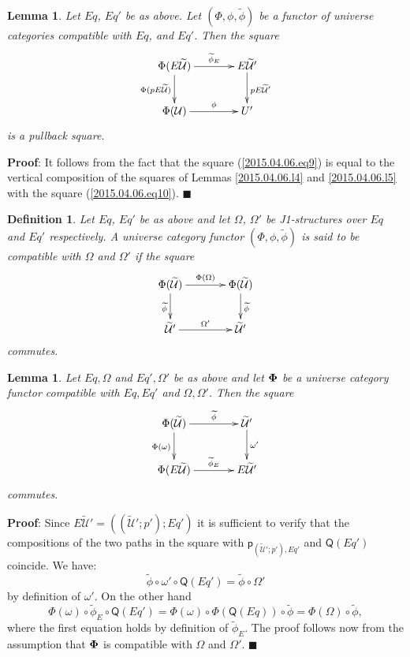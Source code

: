 \documentclass[12pt]{article}
\numberwithin{equation}{section}
\newenvironment{eq}{\begin{equation}}{\end{equation}}
\newenvironment{myproof}{{\bf Proof}:}{$\blacksquare$ \vskip 5mm }
\newtheorem{lemma}[proposition]{Lemma}
\newtheorem{definition}[proposition]{Definition}
\newcommand{\wt}{\widetilde}
\newcommand{\p}{\mathsf{p}}
\newcommand{\U}{\mathcal{U}}
\newcommand{\Q}{\mathsf{Q}}
\begin{document}
%
\begin{lemma}
\label{2015.04.06.l6} Let $Eq$, $Eq'$ be as above. Let $(\Phi,\phi,\wt{\phi})$
be a functor of universe categories compatible with $Eq$, and $Eq'$. Then the
square
%
\begin{eq}\label{2015.04.06.eq9}
\begin{xy}
          \xymatrix@C=3pc{ \Phi(E\wt{\U}) \ar[r]^-{\wt{\phi}_{E}}
            \ar[d]_{\Phi(pE\wt{\U})} & E\wt{\U}' \ar[d]^{pE\wt{\U}'}\\ \Phi(\U)
            \ar[r]^-{\phi} & U' }
\end{xy}
\end{eq}%
%
is a pullback square.
%
\end{lemma} 
%
\begin{myproof}
It follows from the fact that the square (\ref{2015.04.06.eq9}) is equal to the
vertical composition of the squares of Lemmas \ref{2015.04.06.l4} and
\ref{2015.04.06.l5} with the square (\ref{2015.04.06.eq10}).
\end{myproof}
%


\begin{definition}
\label{2015.04.06.def5} Let $Eq$, $Eq'$ be as above and let $\Omega$,
$\Omega'$ be J1-structures over $Eq$ and $Eq'$ respectively. A universe
category functor $(\Phi,\phi,\wt{\phi})$ is said to be compatible with $\Omega$
and $\Omega'$ if the square
%
$$
\begin{xy}
          \xymatrix@C=3pc{ \Phi(\wt{\U}) \ar[r]^-{\Phi(\Omega)}
            \ar[d]_{\wt{\phi}} & \Phi(\wt{\U})\ar[d]^{\wt{\phi}}\\ \wt{\U}'
            \ar[r]^-{\Omega'} & \wt{\U}' }
\end{xy}
$$
%
commutes.
\end{definition}
%
\begin{lemma}
\label{2015.04.10.l7} Let $Eq,\Omega$ and $Eq',\Omega'$ be as above and let
${\bf\Phi}$ be a universe category functor compatible with $Eq,Eq'$ and
$\Omega,\Omega'$. Then the square
%
$$
\begin{xy}
          \xymatrix@C=3pc{ \Phi(\wt{\U}) \ar[r]^-{\wt{\phi}}
            \ar[d]_{\Phi(\omega)} & \wt{\U}'\ar[d]^-{\omega'}\\ \Phi(E\wt{\U})
            \ar[r]^-{\wt{\phi}_{E}} & E\wt{\U}' }
\end{xy}
$$
%
commutes.
\end{lemma}
%
\begin{myproof}
Since $E\wt{\U}'=((\wt{\U}';p');Eq')$ it is sufficient to verify that the
compositions of the two paths in the square with $\p_{(\wt{\U}';p'),Eq'}$ and
$\Q(Eq')$ coincide. We have:
%
$$\wt{\phi}\circ\omega'\circ \Q(Eq')=\wt{\phi}\circ\Omega'$$
%
by definition of $\omega'$. On the other hand
%
$$\Phi(\omega)\circ \wt{\phi}_{E}\circ \Q(Eq')=\Phi(\omega)\circ
\Phi(\Q(Eq))\circ \wt{\phi}=\Phi(\Omega)\circ\wt{\phi},$$
%
where the first equation holds by definition of $\wt{\phi}_{E}$. The proof
follows now from the assumption that ${\bf\Phi}$ is compatible with $\Omega$
and $\Omega'$.
\end{myproof}
%
\end{document}
